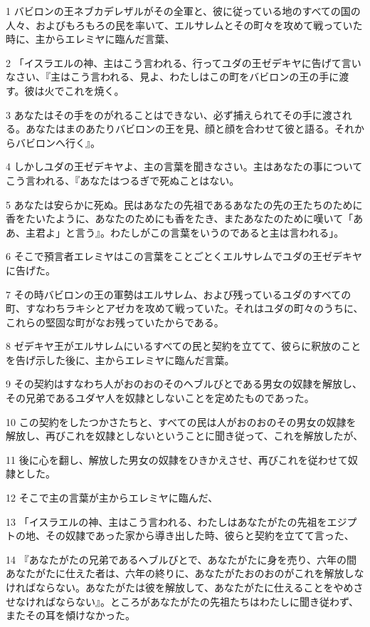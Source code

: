 \par 1 バビロンの王ネブカデレザルがその全軍と、彼に従っている地のすべての国の人々、およびもろもろの民を率いて、エルサレムとその町々を攻めて戦っていた時に、主からエレミヤに臨んだ言葉、
\par 2 「イスラエルの神、主はこう言われる、行ってユダの王ゼデキヤに告げて言いなさい、『主はこう言われる、見よ、わたしはこの町をバビロンの王の手に渡す。彼は火でこれを焼く。
\par 3 あなたはその手をのがれることはできない、必ず捕えられてその手に渡される。あなたはまのあたりバビロンの王を見、顔と顔を合わせて彼と語る。それからバビロンへ行く』。
\par 4 しかしユダの王ゼデキヤよ、主の言葉を聞きなさい。主はあなたの事についてこう言われる、『あなたはつるぎで死ぬことはない。
\par 5 あなたは安らかに死ぬ。民はあなたの先祖であるあなたの先の王たちのために香をたいたように、あなたのためにも香をたき、またあなたのために嘆いて「ああ、主君よ」と言う』。わたしがこの言葉をいうのであると主は言われる」。
\par 6 そこで預言者エレミヤはこの言葉をことごとくエルサレムでユダの王ゼデキヤに告げた。
\par 7 その時バビロンの王の軍勢はエルサレム、および残っているユダのすべての町、すなわちラキシとアゼカを攻めて戦っていた。それはユダの町々のうちに、これらの堅固な町がなお残っていたからである。
\par 8 ゼデキヤ王がエルサレムにいるすべての民と契約を立てて、彼らに釈放のことを告げ示した後に、主からエレミヤに臨んだ言葉。
\par 9 その契約はすなわち人がおのおのそのヘブルびとである男女の奴隷を解放し、その兄弟であるユダヤ人を奴隷としないことを定めたものであった。
\par 10 この契約をしたつかさたちと、すべての民は人がおのおのその男女の奴隷を解放し、再びこれを奴隷としないということに聞き従って、これを解放したが、
\par 11 後に心を翻し、解放した男女の奴隷をひきかえさせ、再びこれを従わせて奴隷とした。
\par 12 そこで主の言葉が主からエレミヤに臨んだ、
\par 13 「イスラエルの神、主はこう言われる、わたしはあなたがたの先祖をエジプトの地、その奴隷であった家から導き出した時、彼らと契約を立てて言った、
\par 14 『あなたがたの兄弟であるヘブルびとで、あなたがたに身を売り、六年の間あなたがたに仕えた者は、六年の終りに、あなたがたおのおのがこれを解放しなければならない。あなたがたは彼を解放して、あなたがたに仕えることをやめさせなければならない』。ところがあなたがたの先祖たちはわたしに聞き従わず、またその耳を傾けなかった。
